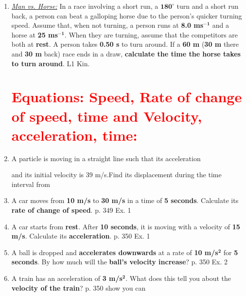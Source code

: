 \documentclass[A4,12pt]{article}
\begin{document}
\begin{enumerate}[label=\bfseries (\arabic*)]

%
%
%
%
%
%
%
%
%
%
%
%
%
%
%
%
%
%
%
%
%
%
%
%
%
%
%
\item \href{https://isaacphysics.org/questions/man_vs_horse?board=72ae6868-9544-47c3-a068-786d3fc0ddd5}{\it Man vs. Horse:} In a race involving a short run, a $\bm{180^\circ}$ turn and a short run back, a person can beat a galloping horse due to the person's quicker turning speed. Assume that, when not turning, a person runs at {\bf 8.0 ms}$\bm{^{-1}}$ and a horse at {\bf 25 ms}$\bm{^{-1}}$. When they are turning, assume that the competitors are both at {\bf rest}. A person takes {\bf 0.50 s} to turn around. If a {\bf 60 m} ({\bf 30 m} there and {\bf 30 m} back) race ends in a draw, {\bf calculate the time the horse takes to turn around}. \cite{Jardine-Wright} L1 Kin.
%
%
%
%
%
%
%
%
%
%
%
%
%
%
%
%
%
%
%
\section*{\textcolor{red}{Equations: Speed, Rate of change of speed, time and Velocity, acceleration, time:}}
%
%
%
%
%
%
%
%
%
%
\item A particle is moving in a straight line such that its acceleration 

 and its initial velocity is 39 m/s.Find its displacement during the time interval from 
%
%
%
%
%
%
%
%
%
%
%
\item A car moves from \textbf{10 m/s} to \textbf{30 m/s} in a time of \textbf{5 seconds}. Calculate its \textbf{rate of change of speed}. \cite{CCEADA} p. 349 Ex. 1
%
%
%
%
%
%
%
%
%
%
%
%
%
%
%
%
\item A car starts from \textbf{rest}. After \textbf{10 seconds}, it is moving with a velocity of \textbf{15 m/s}. Calculate its \textbf{acceleration}. \cite{CCEADA} p. 350 Ex. 1
%
%
%
%
%
%
%
%
%
%
%
%
%
%
%
%
%
%
\item A ball is dropped and \textbf{accelerates downwards} at a rate of \textbf{10 m/s}$\bm{^2}$ for \textbf{5 seconds}. By how much will the \textbf{ball's velocity increase}? \cite{CCEADA} p. 350 Ex. 2
%
%
%
%
%
%
%
%
%
%
%
%
%
%
\item A train has an acceleration of 
\textbf{3 m/s}$\bm{^2}$. What does this tell you about the \textbf{velocity of the train}? \cite{CCEADA} p. 350 show you can
%
%









\end{enumerate}
\end{document}
